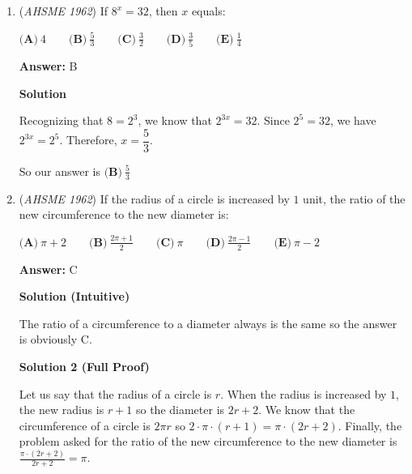 \begin{enumerate}
 \textbf{Answer: }B



\textbf{Solution}

Let $y$ represent the common difference between the terms. We have $(x+1)-y=(x-1)\implies y=2$.

 Substituting gives us $(2x+3)-2=(x+1)\implies 2x+1=x+1\implies x=0$.

 Therefore, our answer is $\boxed{\textbf{(B)}\ 0}$;

 


	\item (\textit{AHSME 1962}) If $8^x = 32$, then $x$ equals:


 $\textbf{(A)}\ 4 \qquad  \textbf{(B)}\ \frac{5}{3} \qquad  \textbf{(C)}\ \frac{3}{2} \qquad  \textbf{(D)}\ \frac{3}{5} \qquad  \textbf{(E)}\ \frac{1}{4}$

 \textbf{Answer: }B



\textbf{Solution}

Recognizing that $8=2^3$, we know that $2^{3x}=32$. Since $2^5=32$, we have $2^{3x}=2^5$. Therefore, $x=\dfrac{5}{3}$.

 So our answer is $\boxed{\textbf{(B)}\ \frac{5}{3}}$



	\item (\textit{AHSME 1962}) If the radius of a circle is increased by $1$ unit, the ratio of the new circumference to the new diameter is:


 $\textbf{(A)}\ \pi + 2 \qquad  \textbf{(B)}\ \frac{2\pi + 1}{2} \qquad  \textbf{(C)}\ \pi \qquad  \textbf{(D)}\ \frac{2\pi - 1}{2} \qquad  \textbf{(E)}\ \pi - 2$

 \textbf{Answer: }C



\textbf{Solution (Intuitive)}

The ratio of a circumference to a diameter always is the same so the answer is obviously C.

 



\textbf{Solution 2 (Full Proof)}

Let us say that the radius of a circle is $r$. When the radius is increased by $1$, the new radius is $r+1$ so the diameter is $2r+2$. We know that the circumference of a circle is $2\pi r$ so $2 \cdot \pi \cdot (r+1) = \pi \cdot (2r+2)$. Finally, the problem asked for the ratio of the new circumference to the new diameter is $\frac{\pi \cdot (2r+2)}{2r+2}=\boxed{\pi}$.


\end{enumerate}
